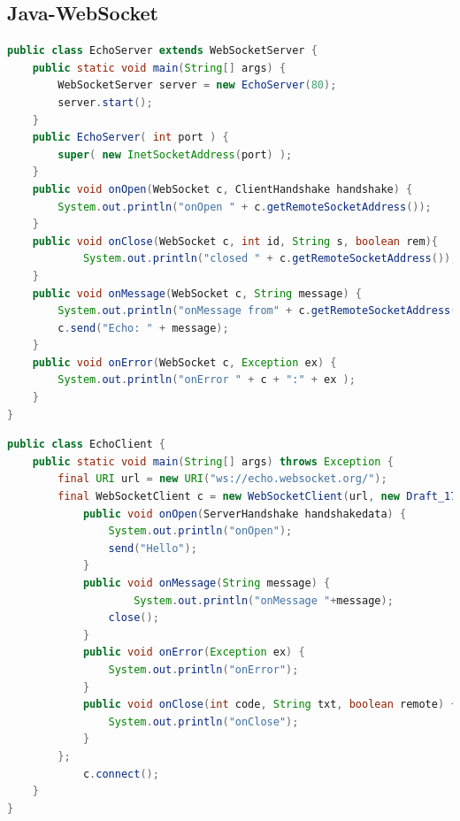 \documentclass[10pt]{article}
\begin{document}
\subsection{Java-WebSocket}
\begin{lstlisting}[language=Java, caption=Echo Server, style=JavaStyle]
public class EchoServer extends WebSocketServer {
	public static void main(String[] args) {
		WebSocketServer server = new EchoServer(80);
		server.start();
	}
	public EchoServer( int port ) {
		super( new InetSocketAddress(port) );
	}
	public void onOpen(WebSocket c, ClientHandshake handshake) {
		System.out.println("onOpen " + c.getRemoteSocketAddress());
	}
	public void onClose(WebSocket c, int id, String s, boolean rem){
    		System.out.println("closed " + c.getRemoteSocketAddress());
  	}
	public void onMessage(WebSocket c, String message) {
		System.out.println("onMessage from" + c.getRemoteSocketAddress() + ": " + message );
		c.send("Echo: " + message);
	}
	public void onError(WebSocket c, Exception ex) {
		System.out.println("onError " + c + ":" + ex );
	}
}
\end{lstlisting}
\begin{lstlisting}[language=Java, caption=Echo Client, style=JavaStyle]
public class EchoClient {
	public static void main(String[] args) throws Exception {
		final URI url = new URI("ws://echo.websocket.org/");
		final WebSocketClient c = new WebSocketClient(url, new Draft_17()) {
			public void onOpen(ServerHandshake handshakedata) {
				System.out.println("onOpen");
				send("Hello");
			}
			public void onMessage(String message) {
        			System.out.println("onMessage "+message);
				close();
			}
			public void onError(Exception ex) {
				System.out.println("onError");
			}
			public void onClose(int code, String txt, boolean remote) {
				System.out.println("onClose");
			}
		};
    		c.connect();
	}
}
\end{lstlisting}
\end{document}
